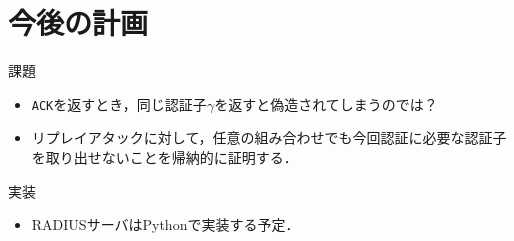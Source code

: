 \section{今後の計画}
\toc
\begin{frame}{\fft}
    \begin{alertblock}{課題}
        \begin{itemize}
            \item \texttt{ACK}を返すとき，同じ認証子\(\gamma\)を返すと偽造されてしまうのでは？
            \item リプレイアタックに対して，任意の組み合わせでも今回認証に必要な認証子を取り出せないことを帰納的に証明する．
        \end{itemize}
    \end{alertblock}
    \vfill
    \begin{exampleblock}{実装}
        \begin{itemize}
            \item RADIUSサーバはPythonで実装する予定．
        \end{itemize}
    \end{exampleblock}
\end{frame}
